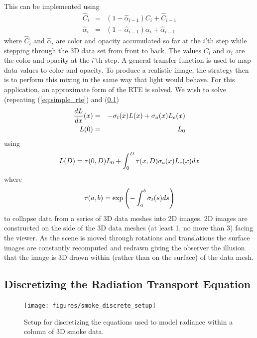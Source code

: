 This can be implemented \cite[Chapter 39]{gpugems} using
\begin{eqnarray*}
\hat{C}_i&=&\left(1-\hat{\alpha}_{i-1}\right)C_i + \hat{C}_{i-1}\\
\hat{\alpha}_i&=&\left(1-\hat{\alpha}_{i-1}\right)\alpha_i+\hat{\alpha}_{i-1}
\end{eqnarray*}
where $\hat{C}_i$ and $\hat{\alpha}_i$ are color and opacity
accumulated so far at the $i$'th step while stepping through the
3D data set from front to back.  The values $C_i$ and $\alpha_i$
are the color and opacity at the $i$'th step.  A general transfer
function is used to map data values to color and opacity. To
produce a realistic image, the strategy then is to perform this
mixing in the same way that light would behave.  For this
application, an approximate form of the RTE is solved.  We wish to
solve (repeating (\ref{eq:simple_rte}) and (\ref{})
\begin{eqnarray}
\label{eq:simple_rtee}
\frac{dL}{dx}(x)&=&-\sigma_t(x) L(x) + \sigma_a(x) L_e(x)\\
 L(0)&=&L_0\nonumber
\end{eqnarray}
using
\begin{equation}
\label{eq:rtesoln}
 L(D)=\tau(0,D)L_0 + \int_0^D\tau(x,D)\sigma_a(x)L_e(x) dx
\end{equation}
where
\begin{equation}
\label{eq:optdepth}
\tau(a,b)=\exp\left({-\int_a^b \sigma_t(s) ds}\right)
\end{equation}
to collapse data from a series of 3D data meshes into 2D images.
2D images are constructed on the side of the 3D data meshes (at
least 1, no more than 3) facing the viewer.  As the scene is moved
through rotations and translations the surface images are
constantly recomputed and redrawn giving the observer the illusion
that the image is 3D drawn within (rather than on the surface) of
the data mesh.

\subsection{Discretizing the Radiation Transport Equation}
\newcommand{\htau}[1]{\hat{\tau}_{#1}}
\newcommand{\sigai}[1]{\sigma_{a,#1}}
\newcommand{\Lei}[1]{L_{e,#1}}

\begin{figure}[\figoptions]
\begin{center}
\texttt{[image: figures/smoke\_discrete\_setup]}
\end{center}
\caption {Setup for discretizing the equations used to model
radiance within a column of 3D smoke data.}
\label{figsmokediscretesetup}
\end{figure}

